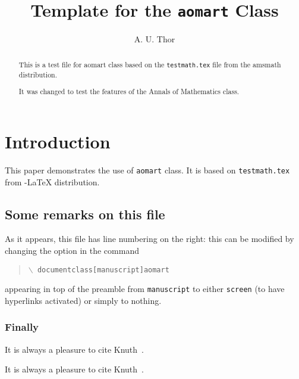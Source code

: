 \documentclass{aomart}
\title[Template]{Template for the \texttt{aomart}
  Class}
\author[A.T.]{A. U. Thor}
\begin{document}
\begin{abstract}
  This is a test file for \textsf{aomart} class based on the
  \texttt{testmath.tex} file from the \textsf{amsmath} distribution.

  It was changed to test the features of the Annals of Mathematics
  class.
\end{abstract}

\maketitle
\tableofcontents

\section{Introduction}


This paper demonstrates the use of \texttt{aomart} class.  It is based
on \texttt{testmath.tex} from  \AmS-\LaTeX{} distribution.  \subsection{Some remarks on this file}
As it appears, this file has line numbering on the right: this can be modified by changing the option in the command
\begin{quote}
\texttt{$\backslash$ documentclass[manuscript]{aomart}}
\end{quote}
appearing in top of the preamble from \texttt{manuscript} to either \texttt{screen} (to have hyperlinks activated) or simply to nothing.

\subsubsection{Finally}
It is always a pleasure to cite Knuth~\cite{Knuth94:TheTeXbook}.

It is always a pleasure to cite Knuth~\cite{Knuth94:TheTeXbook}.




\end{document}
